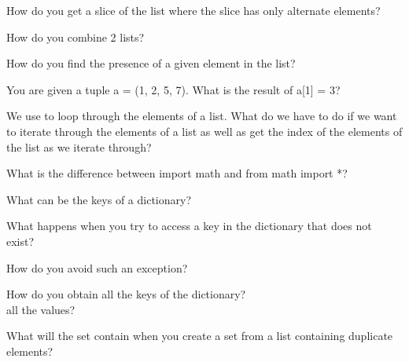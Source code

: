 \documentclass[14pt,compress]{beamer}
\newcommand{\kwrd}[1]{ \texttt{\textbf{\color{blue}{#1}}}  }
\begin{document}
\begin{frame}{}
  How do you get a slice of the list where the slice has only alternate elements?
\end{frame}

\begin{frame}{}
  How do you combine 2 lists?
\end{frame}

\begin{frame}{}
  How do you find the presence of a given element in the list?
\end{frame}

\begin{frame}{}
  You are given a tuple a = (1, 2, 5, 7). What is the result of a[1] = 3?
\end{frame}

\begin{frame}{}
  We use \kwrd{for} to loop through the elements of a list. What do we have to do if we want to iterate through the elements of a list as well as get the index of the elements of the list as we iterate through?
\end{frame}

\begin{frame}{}
  What is the difference between import math and from math import *?
\end{frame}

\begin{frame}{}
  What can be the keys of a dictionary?
\end{frame}

\begin{frame}{}
  What happens when you try to access a key in the dictionary that does not exist?
\end{frame}

\begin{frame}{}
  How do you avoid such an exception?
\end{frame}

\begin{frame}{}
  How do you obtain all the keys of the dictionary?
  \pause
  \\all the values?
\end{frame}

\begin{frame}{}
  What will the set contain when you create a set from a list containing duplicate elements?
\end{frame}
\end{document}
